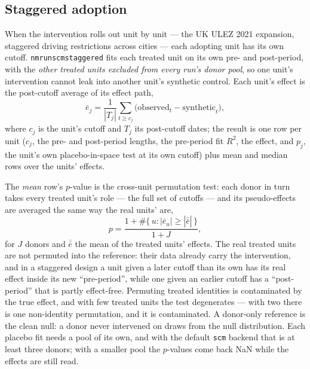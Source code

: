 \documentclass[11pt]{report}
\newcommand{\codeunderscore}{\textunderscore\allowbreak}
\newcommand{\code}[1]{\texttt{\let\_\codeunderscore #1}}
\begin{document}
\subsection{Staggered adoption}\label{sec:scmstaggered}
When the intervention rolls out unit by unit — the UK ULEZ 2021 expansion, staggered
driving restrictions across cities — each adopting unit has its own cutoff.
\code{nm\_run\_scm\_staggered} fits each treated unit on its own pre- and post-period, with
the \emph{other treated units excluded from every run's donor pool}, so one unit's
intervention cannot leak into another unit's synthetic control. Each unit's effect is
the post-cutoff average of its effect path,
\begin{equation}
  \bar{e}_j = \frac{1}{|T_j|} \sum_{t \ge c_j} \bigl(\text{observed}_t -
  \text{synthetic}_t\bigr),
\end{equation}
where $c_j$ is the unit's cutoff and $T_j$ its post-cutoff dates; the result is one row
per unit ($c_j$, the pre- and post-period lengths, the pre-period fit $R^2$, the effect,
and $p_j$, the unit's own placebo-in-space test at its own cutoff) plus mean and median
rows over the units' effects.

The \emph{mean} row's $p$-value is the cross-unit permutation test: each donor in turn
takes every treated unit's role — the full set of cutoffs — and its pseudo-effects are
averaged the same way the real units' are,
\begin{equation}
  p = \frac{1 + \#\{\,u : |\bar{e}_u| \ge |\bar{\bar{e}}|\,\}}{1 + J},
\end{equation}
for $J$ donors and $\bar{\bar{e}}$ the mean of the treated units' effects. The real
treated units are not permuted into the reference: their data already carry the
intervention, and in a staggered design a unit given a later cutoff than its own has its
real effect inside its new ``pre-period'', while one given an earlier cutoff has a
``post-period'' that is partly effect-free. Permuting treated identities is contaminated
by the true effect, and with few treated units the test degenerates — with two there is
one non-identity permutation, and it is contaminated. A donor-only reference is the clean
null: a donor never intervened on draws from the null distribution. Each placebo fit
needs a pool of its own, and with the default \code{scm} backend that is at least three
donors; with a smaller pool the $p$-values come back NaN while the effects are still
read.

\end{document}
